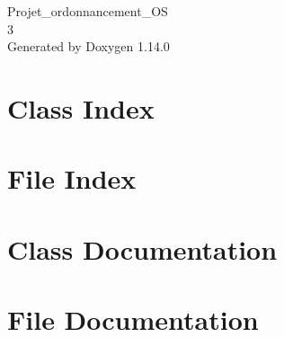 \documentclass[twoside]{book}
\newcommand{\+}{\discretionary{\mbox{\scriptsize$\hookleftarrow$}}{}{}}
\newcommand{\clearemptydoublepage}{%
    \newpage{\pagestyle{empty}\cleardoublepage}%
  }
\begin{document}
  \raggedbottom
    \hypersetup{pageanchor=false,
                bookmarksnumbered=true,
                pdfencoding=unicode
               }
  \begin{titlepage}
  \vspace*{7cm}
  \begin{center}%
  {\Large Projet\+\_\+ordonnancement\+\_\+\+OS}\\
  [1ex]\large 3 \\
  \vspace*{1cm}
  {\large Generated by Doxygen 1.14.0}\\
  \end{center}
  \end{titlepage}
  \clearemptydoublepage
  \tableofcontents
  \clearemptydoublepage
  \hypersetup{pageanchor=true}
\chapter{Class Index}

\chapter{File Index}

\chapter{Class Documentation}



\chapter{File Documentation}






















  \backmatter
  \newpage
  \clearemptydoublepage
  \printindex
\end{document}
